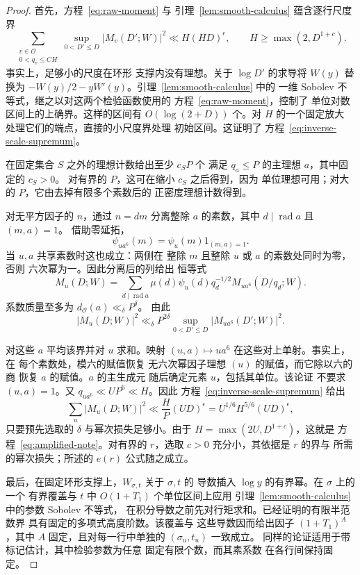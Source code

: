 \documentclass[11pt,a4paper]{article}
\numberwithin{equation}{section}
\numberwithin{figure}{section}
\theoremstyle{definition}
\theoremstyle{remark}
\begin{document}
\begin{proof}
首先，方程~\eqref{eq:raw-moment} 与
引理~\ref{lem:smooth-calculus} 蕴含逐行尺度界
\begin{equation}\label{eq:inverse-scale-supremum}
 \sum_{\substack{v\in\mathcal O\\0<q_v\le C H}}
       \sup_{0<D'\le D}|M_v(D';W)|^2
 \ll H(HD)^\epsilon,\qquad H\ge\max(2,D^{1+c}).
\end{equation}
事实上，足够小的尺度在环形
支撑内没有理想。关于 \(\log D'\) 的求导将
\(W(y)\) 替换为 \(-W(y)/2-yW'(y)\)。引理~\ref{lem:smooth-calculus} 中的
一维 Sobolev 不等式，继之以对这两个检验函数使用的
方程~\eqref{eq:raw-moment}，控制了
单位对数区间上的上确界。这样的区间有
\(O(\log(2+D))\) 个。对 \(H\) 的一个固定放大
处理它们的端点，直接的小尺度界处理
初始区间。这证明了
方程~\eqref{eq:inverse-scale-supremum}。

在固定集合 \(S\) 之外的理想计数给出至少 \(c_S P\) 个
满足 \(q_a\le P\) 的主理想 \(a\)，其中固定的 \(c_S>0\)。
对有界的 \(P\)，这可在缩小 \(c_S\) 之后得到，因为
单位理想可用；对大的 \(P\)，它由去掉有限多个素数后的
正密度理想计数得到。

对无平方因子的 \(n\)，通过
\(n=dm\) 分离整除 \(a\) 的素数，其中 \(d\mid\operatorname{rad}a\) 且 \((m,a)=1\)。
借助零延拓，
\[
 \psi_{ua^6}(m)=\psi_u(m)1_{(m,a)=1}.
\]
当 \(u,a\) 共享素数时这也成立：两侧在
整除 \(m\) 且整除 \(u\) 或 \(a\) 的素数处同时为零，否则
六次幂为一。因此分离后的列给出
恒等式
\begin{equation}\label{eq:sixth-power-column-identity}
 M_u(D;W)=\sum_{d\mid\operatorname{rad}a}
       \mu(d)\psi_u(d)q_d^{-1/2}M_{ua^6}(D/q_d;W).
\end{equation}
系数质量至多为 \(d_{\mathcal O}(a)\ll_\delta P^\delta\)。
由此
\[
 |M_u(D;W)|^2\ll_\delta
 P^{2\delta}\sup_{0<D'\le D}|M_{ua^6}(D';W)|^2.
\]

对这些 \(a\) 平均该界并对 \(u\) 求和。映射
\((u,a)\mapsto ua^6\) 在这些对上单射。事实上，在
每个素数处，模六的赋值恢复
无六次幂因子理想 \((u)\) 的赋值，而它除以六的商
恢复 \(a\) 的赋值。\(a\) 的主生成元
随后确定元素 \(u\)，包括其单位。该论证
不要求 \((u,a)=1\)。又
\(q_{ua^6}\ll UP^6\ll H\)。因此
方程~\eqref{eq:inverse-scale-supremum} 给出
\[
 \sum_u|M_u(D;W)|^2
 \ll \frac HP(UD)^\epsilon
 =U^{1/6}H^{5/6}(UD)^\epsilon,
\]
只要预先选取的 \(\delta\) 与幂次损失足够小。由于
\(H=\max(2U,D^{1+c})\)，这就是
方程~\eqref{eq:amplified-note}。对有界的 \(r\)，选取
\(c>0\) 充分小，其依据是 \(r\) 的界与
所需的幂次损失；所述的 \(e(r)\) 公式随之成立。

最后，在固定环形支撑上，\(W_{\sigma,t}\) 关于 \(\sigma,t\) 的
导数插入 \(\log y\) 的有界幂。在 \(\sigma\) 上的一个
有界覆盖与 \(t\) 中 \(O(1+T_1)\) 个单位区间上应用
引理~\ref{lem:smooth-calculus} 中的参数 Sobolev 不等式，
在积分导数之前先对行矩求和。已经证明的有限半范数界
具有固定的多项式高度阶数。该覆盖与
这些导数因而给出因子 \((1+T_1)^A\)，其中
\(A\) 固定，且对每一行中单独的 \((\sigma_u,t_u)\) 一致成立。
同样的论证适用于带标记估计，其中检验参数为任意
固定有限个数，而其素系数
在各行间保持固定。
\end{proof}
\end{document}

